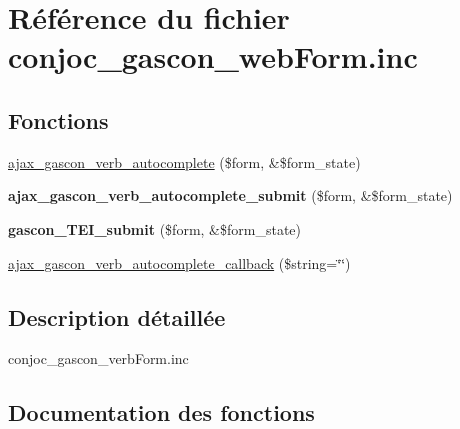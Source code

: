 \hypertarget{conjoc__gascon__webForm_8inc}{}\section{Référence du fichier conjoc\+\_\+gascon\+\_\+web\+Form.\+inc}
\label{conjoc__gascon__webForm_8inc}
\subsection*{Fonctions}
\begin{DoxyCompactItemize}
\item 
\hyperlink{conjoc__gascon__webForm_8inc_a28516e435edf21d85ed77091d71f5d6b}{ajax\+\_\+gascon\+\_\+verb\+\_\+autocomplete} (\$form, \&\$form\+\_\+state)
\item 
\hypertarget{conjoc__gascon__webForm_8inc_a332dbb7ab0a2190165164326af8cc7f1}{}\label{conjoc__gascon__webForm_8inc_a332dbb7ab0a2190165164326af8cc7f1} 
{\bfseries ajax\+\_\+gascon\+\_\+verb\+\_\+autocomplete\+\_\+submit} (\$form, \&\$form\+\_\+state)
\item 
\hypertarget{conjoc__gascon__webForm_8inc_aeae9bd30b3fa7e4a9edf10587db73c23}{}\label{conjoc__gascon__webForm_8inc_aeae9bd30b3fa7e4a9edf10587db73c23} 
{\bfseries gascon\+\_\+\+T\+E\+I\+\_\+submit} (\$form, \&\$form\+\_\+state)
\item 
\hyperlink{conjoc__gascon__webForm_8inc_a1be8e9edb4dcdb19c5b5bb88b48c5980}{ajax\+\_\+gascon\+\_\+verb\+\_\+autocomplete\+\_\+callback} (\$string=\char`\"{}\char`\"{})
\end{DoxyCompactItemize}


\subsection{Description détaillée}
conjoc\+\_\+gascon\+\_\+verb\+Form.\+inc 

\subsection{Documentation des fonctions}
\hypertarget{conjoc__gascon__webForm_8inc_a28516e435edf21d85ed77091d71f5d6b}{}\label{conjoc__gascon__webForm_8inc_a28516e435edf21d85ed77091d71f5d6b} 
